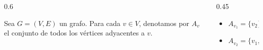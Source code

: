 \begin{frame}[c]
   \vspace*{0.83cm}%
   \begin{columns}[c,totalwidth=1.05\textwidth]
      \begin{column}{0.6\textwidth}
         \hfill
         \begin{minipage}{0.9\linewidth}
            \begin{Def}
               Sea $G=(V,E)$ un grafo. Para cada $v \in V$, denotamos por $A_v$ el conjunto de todos los vértices adyacentes a $v$.\vspace{0.3cm}
            \end{Def}
         \end{minipage}
         \hfill\null
      \end{column}
      \begin{column}{0.45\textwidth}
         \centering

         \vspace{0.4cm}
         \begin{minipage}{0.95\linewidth}
            \begin{itemize}
               \item<3-> $A_{v_1}=\{v_2\}$
               \item<4-> $A_{v_2}=\{v_1,v_3,v_4,v_5\}$
            \end{itemize}
         \end{minipage}
      \end{column}
   \end{columns}
\end{frame}

